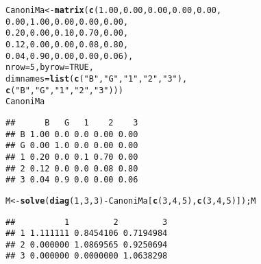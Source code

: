 \documentclass[11pt]{article}\usepackage[]{graphicx}\usepackage[table]{xcolor}
\makeatletter
\newcommand{\hlnum}[1]{\textcolor[rgb]{0.686,0.059,0.569}{#1}}%
\newcommand{\hlstr}[1]{\textcolor[rgb]{0.192,0.494,0.8}{#1}}%
\newcommand{\hlopt}[1]{\textcolor[rgb]{0,0,0}{#1}}%
\newcommand{\hlstd}[1]{\textcolor[rgb]{0.345,0.345,0.345}{#1}}%
\newcommand{\hlkwb}[1]{\textcolor[rgb]{0.69,0.353,0.396}{#1}}%
\newcommand{\hlkwc}[1]{\textcolor[rgb]{0.333,0.667,0.333}{#1}}%
\newcommand{\hlkwd}[1]{\textcolor[rgb]{0.737,0.353,0.396}{\textbf{#1}}}%
\newenvironment{kframe}{%
 \def\at@end@of@kframe{}%
 \ifinner\ifhmode%
  \def\at@end@of@kframe{\end{minipage}}%
  \begin{minipage}{\columnwidth}%
 \fi\fi%
 \def\FrameCommand##1{\hskip\@totalleftmargin \hskip-\fboxsep
 \colorbox{shadecolor}{##1}\hskip-\fboxsep
     \hskip-\linewidth \hskip-\@totalleftmargin \hskip\columnwidth}%
 \MakeFramed {\advance\hsize-\width
   \@totalleftmargin\z@ \linewidth\hsize
   \@setminipage}}%
 {\par\unskip\endMakeFramed%
 \at@end@of@kframe}
\newenvironment{knitrout}{}{} %
\makeatother
\begin{document}
\begin{knitrout}
\color{fgcolor}\begin{kframe}
\begin{alltt}
\hlstd{CanoniMa} \hlkwb{<-} \hlkwd{matrix}\hlstd{(}\hlkwd{c}\hlstd{(}\hlnum{1.00}\hlstd{,}\hlnum{0.00}\hlstd{,}\hlnum{0.00}\hlstd{,}\hlnum{0.00}\hlstd{,}\hlnum{0.00}\hlstd{,}
                    \hlnum{0.00}\hlstd{,}\hlnum{1.00}\hlstd{,}\hlnum{0.00}\hlstd{,}\hlnum{0.00}\hlstd{,}\hlnum{0.00}\hlstd{,}
                    \hlnum{0.20}\hlstd{,}\hlnum{0.00}\hlstd{,}\hlnum{0.10}\hlstd{,}\hlnum{0.70}\hlstd{,}\hlnum{0.00}\hlstd{,}
                    \hlnum{0.12}\hlstd{,}\hlnum{0.00}\hlstd{,}\hlnum{0.00}\hlstd{,}\hlnum{0.08}\hlstd{,}\hlnum{0.80}\hlstd{,}
                    \hlnum{0.04}\hlstd{,}\hlnum{0.90}\hlstd{,}\hlnum{0.00}\hlstd{,}\hlnum{0.00}\hlstd{,}\hlnum{0.06}\hlstd{),}
                    \hlkwc{nrow} \hlstd{=} \hlnum{5}\hlstd{,} \hlkwc{byrow} \hlstd{=} \hlnum{TRUE}\hlstd{,}
                    \hlkwc{dimnames} \hlstd{=} \hlkwd{list}\hlstd{(}\hlkwd{c}\hlstd{(}\hlstr{"B"}\hlstd{,}\hlstr{"G"}\hlstd{,}\hlstr{"1"}\hlstd{,}\hlstr{"2"}\hlstd{,}\hlstr{"3"}\hlstd{),}
                                    \hlkwd{c}\hlstd{(}\hlstr{"B"}\hlstd{,}\hlstr{"G"}\hlstd{,}\hlstr{"1"}\hlstd{,}\hlstr{"2"}\hlstd{,}\hlstr{"3"}\hlstd{)))}
\hlstd{CanoniMa}
\end{alltt}
\begin{verbatim}
##      B   G   1    2    3
## B 1.00 0.0 0.0 0.00 0.00
## G 0.00 1.0 0.0 0.00 0.00
## 1 0.20 0.0 0.1 0.70 0.00
## 2 0.12 0.0 0.0 0.08 0.80
## 3 0.04 0.9 0.0 0.00 0.06
\end{verbatim}
\begin{alltt}
\hlstd{M} \hlkwb{<-} \hlkwd{solve}\hlstd{(}\hlkwd{diag}\hlstd{(}\hlnum{1}\hlstd{,}\hlnum{3}\hlstd{,}\hlnum{3}\hlstd{)} \hlopt{-} \hlstd{CanoniMa[}\hlkwd{c}\hlstd{(}\hlnum{3}\hlstd{,}\hlnum{4}\hlstd{,}\hlnum{5}\hlstd{),} \hlkwd{c}\hlstd{(}\hlnum{3}\hlstd{,}\hlnum{4}\hlstd{,}\hlnum{5}\hlstd{)]); M}
\end{alltt}
\begin{verbatim}
##          1         2         3
## 1 1.111111 0.8454106 0.7194984
## 2 0.000000 1.0869565 0.9250694
## 3 0.000000 0.0000000 1.0638298
\end{verbatim}
\end{kframe}
\end{knitrout}
\end{document}
